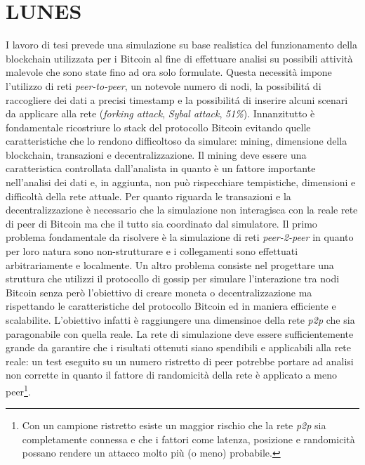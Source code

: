 \chapter{LUNES}
I lavoro di tesi prevede una simulazione su base realistica del funzionamento della blockchain utilizzata per i Bitcoin al fine di effettuare analisi su possibili attività malevole che sono state fino ad ora solo formulate.\newline
Questa necessità impone l'utilizzo di reti \textit{peer-to-peer}, un notevole numero di nodi, la possibilitá di raccogliere dei dati a precisi timestamp e la possibilitá di inserire alcuni scenari da applicare alla rete (\textit{forking attack}, \textit{Sybal attack}, \textit{51\%}).\newline
Innanzitutto è fondamentale ricostriure lo stack del protocollo Bitcoin evitando quelle caratteristiche che lo rendono difficoltoso da simulare: mining, dimensione della blockchain, transazioni e decentralizzazione.\newline
Il mining deve essere una caratteristica controllata dall'analista in quanto è un fattore importante nell'analisi dei dati e, in aggiunta, non può rispecchiare tempistiche, dimensioni e difficoltà della rete attuale.\newline
Per quanto riguarda le transazioni e la decentralizzazione è necessario che la simulazione non interagisca con la reale rete di peer di Bitcoin ma che il tutto sia coordinato dal simulatore.\newline
Il primo problema fondamentale da risolvere è la simulazione di reti \textit{peer-2-peer} in quanto per loro natura sono non-strutturare e i collegamenti sono effettuati arbitrariamente e localmente. Un altro problema consiste nel progettare una struttura che utilizzi il protocollo di gossip per simulare l'interazione tra nodi Bitcoin senza però l'obiettivo di creare moneta o decentralizzazione ma rispettando le caratteristiche del protocollo Bitcoin ed in maniera efficiente e scalabilite. L'obiettivo infatti è raggiungere una dimensinoe della rete \textit{p2p} che sia paragonabile con quella reale. La rete di simulazione deve essere sufficientemente grande da garantire che i risultati ottenuti siano spendibili e applicabili alla rete reale: un test eseguito su un numero ristretto di peer potrebbe portare ad analisi non corrette in quanto il fattore di randomicità della rete è applicato a meno peer\footnote{Con un campione ristretto esiste un maggior rischio che la rete \textit{p2p} sia completamente connessa e che i fattori come latenza, posizione e randomicità possano rendere un attacco molto più (o meno) probabile.}.


